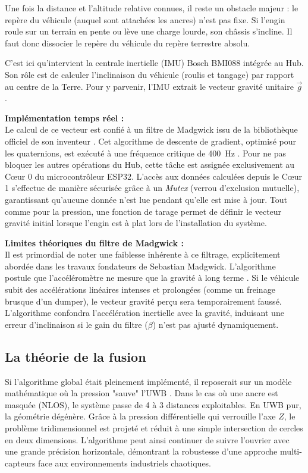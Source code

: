 Une fois la distance et l'altitude relative connues, il reste un obstacle majeur : le repère du véhicule (auquel sont attachées les ancres) n'est pas fixe. Si l'engin roule sur un terrain en pente ou lève une charge lourde, son châssis s'incline. Il faut donc dissocier le repère du véhicule du repère terrestre absolu.

C'est ici qu'intervient la centrale inertielle (IMU) Bosch BMI088 intégrée au Hub. Son rôle est de calculer l'inclinaison du véhicule (roulis et tangage) par rapport au centre de la Terre. Pour y parvenir, l'IMU extrait le vecteur gravité unitaire $\vec{g}$.

\textbf{Implémentation temps réel :}\\
Le calcul de ce vecteur est confié à un filtre de Madgwick issu de la bibliothèque officiel de son inventeur \cite{bolder_flight_bmi088}. Cet algorithme de descente de gradient, optimisé pour les quaternions, est exécuté à une fréquence critique de 400~Hz \cite{Madgwick_2010}. Pour ne pas bloquer les autres opérations du Hub, cette tâche est assignée exclusivement au Cœur 0 du microcontrôleur ESP32. L'accès aux données calculées depuis le Cœur 1 s'effectue de manière sécurisée grâce à un \textit{Mutex} (verrou d'exclusion mutuelle), garantissant qu'aucune donnée n'est lue pendant qu'elle est mise à jour. Tout comme pour la pression, une fonction de tarage permet de définir le vecteur gravité initial lorsque l'engin est à plat lors de l'installation du système.

\textbf{Limites théoriques du filtre de Madgwick :}\\
Il est primordial de noter une faiblesse inhérente à ce filtrage, explicitement abordée dans les travaux fondateurs de Sebastian Madgwick. L'algorithme postule que l'accéléromètre ne mesure que la gravité à long terme \cite{Madgwick_2010}. Si le véhicule subit des accélérations linéaires intenses et prolongées (comme un freinage brusque d'un dumper), le vecteur gravité perçu sera temporairement faussé. L'algorithme confondra l'accélération inertielle avec la gravité, induisant une erreur d'inclinaison si le gain du filtre ($\beta$) n'est pas ajusté dynamiquement.

\subsection{La théorie de la fusion}

Si l'algorithme global était pleinement implémenté, il reposerait sur un modèle mathématique où la pression "sauve" l'UWB \cite{Heiligers_2020}. Dans le cas où une ancre est masquée (NLOS), le système passe de 4 à 3 distances exploitables. En UWB pur, la géométrie dégénère. Grâce à la pression différentielle qui verrouille l'axe $Z$, le problème tridimensionnel est projeté et réduit à une simple intersection de cercles en deux dimensions. L'algorithme peut ainsi continuer de suivre l'ouvrier avec une grande précision horizontale, démontrant la robustesse d'une approche multi-capteurs face aux environnements industriels chaotiques.

